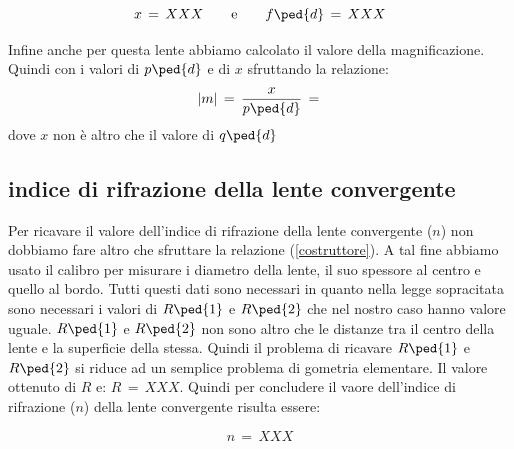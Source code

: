 \begin{equation}
	x \,=\, XXX \qquad \text{e} \qquad f\ped{d} \,=\, XXX
\end{equation}

Infine anche per questa lente abbiamo calcolato il valore della magnificazione. Quindi con i valori di $p\ped{d}$ e di $x$ sfruttando la relazione:
\begin{equation}
	|m| \,=\, \frac{x}{p\ped{d}} \,=\,
\end{equation}
dove $x$ non è altro che il valore di $q\ped{d}$

\subsection{indice di rifrazione della lente convergente}

Per ricavare il valore dell'indice di rifrazione della lente convergente ($n$) non dobbiamo fare altro che sfruttare la relazione (\ref{costruttore}). A tal fine abbiamo usato il calibro per misurare i diametro della lente, il suo spessore al centro e quello al bordo. Tutti questi dati sono necessari in quanto nella legge sopracitata sono necessari i valori di $R\ped{1}$ e $R\ped{2}$ che nel nostro caso hanno valore uguale. $R\ped{1}$ e $R\ped{2}$ non sono altro che le distanze tra il centro della lente e la superficie della stessa. Quindi il problema di ricavare $R\ped{1}$ e $R\ped{2}$ si riduce ad un semplice problema di gometria elementare.
Il valore ottenuto di $R$ e: $R \,=\, XXX$.
Quindi per concludere il vaore dell'indice di rifrazione ($n$) della lente convergente risulta essere:

\begin{equation}
	n \,=\, XXX
\end{equation}







